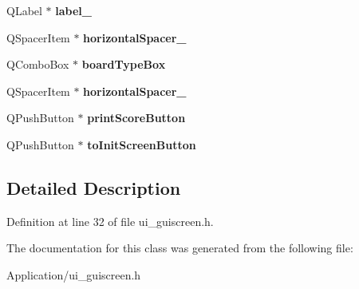 \begin{DoxyCompactItemize}
Q\+Label $\ast$ {\bfseries label\+\_}
\item 
\mbox{\label{class_ui___g_u_i_screen_a31c7bbf132e097882bb4127f300f8aab}} 
Q\+Spacer\+Item $\ast$ {\bfseries horizontal\+Spacer\+\_}
\item 
\mbox{\label{class_ui___g_u_i_screen_a55537d63eb5fbd3185eacc1151b1c1ff}} 
Q\+Combo\+Box $\ast$ {\bfseries board\+Type\+Box}
\item 
\mbox{\label{class_ui___g_u_i_screen_aa9621b0257f383b893f1fa418e85ce49}} 
Q\+Spacer\+Item $\ast$ {\bfseries horizontal\+Spacer\+\_}
\item 
\mbox{\label{class_ui___g_u_i_screen_af0591d21d68d848c16efb1b74e27a6d5}} 
Q\+Push\+Button $\ast$ {\bfseries print\+Score\+Button}
\item 
\mbox{\label{class_ui___g_u_i_screen_a06c7d37afb6b87d408a4152b9fd71577}} 
Q\+Push\+Button $\ast$ {\bfseries to\+Init\+Screen\+Button}
\end{DoxyCompactItemize}


\subsection{Detailed Description}


Definition at line 32 of file ui\+\_\+guiscreen.\+h.



The documentation for this class was generated from the following file\+:\begin{DoxyCompactItemize}
\item 
Application/ui\+\_\+guiscreen.\+h\end{DoxyCompactItemize}
